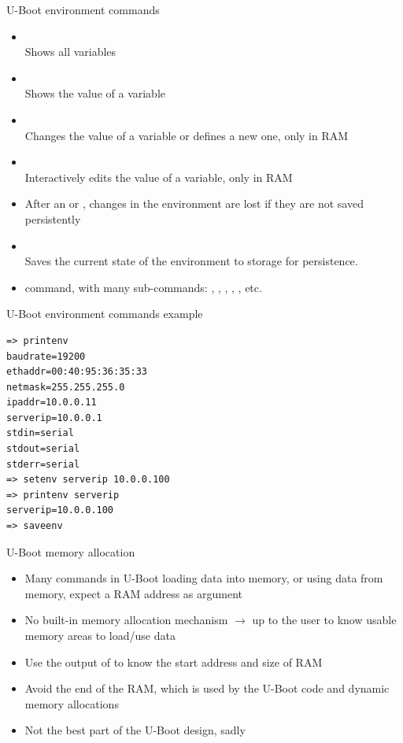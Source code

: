 \begin{frame}{U-Boot environment commands}
  \begin{itemize}
    \item {}\\
      Shows all variables
    \item {}\\
      Shows the value of a variable
    \item {}\\
      Changes the value of a variable or defines a new one, only in RAM
    \item {}\\
      Interactively edits the value of a variable, only in RAM
    \item After an  or , changes in the
      environment are lost if they are not saved persistently
    \item {}\\
      Saves the current state of the environment to storage for persistence.
    \item {} command, with many sub-commands: , , , ,
      , etc.
  \end{itemize}
\end{frame}

\begin{frame}[fragile]{U-Boot environment commands example}
  \begin{block}{}
\small
\begin{verbatim}
=> printenv
baudrate=19200
ethaddr=00:40:95:36:35:33
netmask=255.255.255.0
ipaddr=10.0.0.11
serverip=10.0.0.1
stdin=serial
stdout=serial
stderr=serial
=> setenv serverip 10.0.0.100
=> printenv serverip
serverip=10.0.0.100
=> saveenv
\end{verbatim}
\end{block}
\end{frame}

\begin{frame}{U-Boot memory allocation}
  \begin{itemize}
  \item Many commands in U-Boot loading data into memory, or using
    data from memory, expect a RAM address as argument
  \item No built-in memory allocation mechanism $\rightarrow$ up to
    the user to know usable memory areas to load/use data
  \item Use the output of  to know the start address and
    size of RAM
  \item Avoid the end of the RAM, which is used by the U-Boot code and
    dynamic memory allocations
  \item Not the best part of the U-Boot design, sadly
  \end{itemize}
\end{frame}

